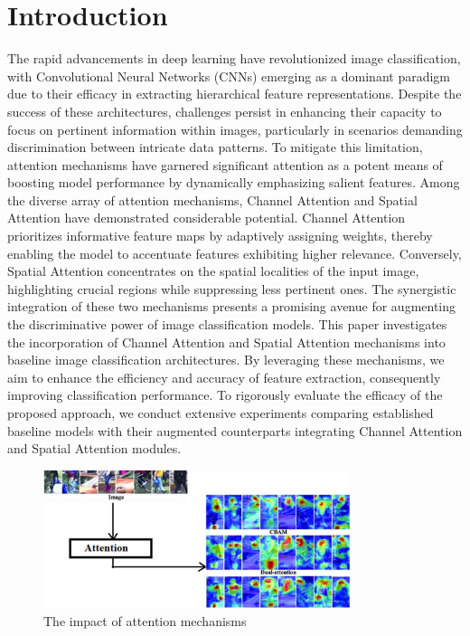 \documentclass[pdflatex,sn-mathphys-num]{sn-jnl}%
\theoremstyle{thmstyleone}%
\theoremstyle{thmstyletwo}%
\theoremstyle{thmstylethree}%
\begin{document}
\section{Introduction}\label{sec1}
The rapid advancements in deep learning have revolutionized image classification, with Convolutional Neural Networks (CNNs) emerging as a dominant paradigm due to their efficacy in extracting hierarchical feature representations. Despite the success of these architectures, challenges persist in enhancing their capacity to focus on pertinent information within images, particularly in scenarios demanding discrimination between intricate data patterns.
To mitigate this limitation, attention mechanisms have garnered significant attention as a potent means of boosting model performance by dynamically emphasizing salient features. Among the diverse array of attention mechanisms, Channel Attention and Spatial Attention have demonstrated considerable potential\cite{b1}. Channel Attention prioritizes informative feature maps by adaptively assigning weights, thereby enabling the model to accentuate features exhibiting higher relevance\cite{b4}. Conversely, Spatial Attention concentrates on the spatial localities of the input image, highlighting crucial regions while suppressing less pertinent ones\cite{b4}. The synergistic integration of these two mechanisms presents a promising avenue for augmenting the discriminative power of image classification models.
This paper investigates the incorporation of Channel Attention and Spatial Attention mechanisms into baseline image classification architectures. By leveraging these mechanisms, we aim to enhance the efficiency and accuracy of feature extraction, consequently improving classification performance. To rigorously evaluate the efficacy of the proposed approach, we conduct extensive experiments comparing established baseline models with their augmented counterparts integrating Channel Attention and Spatial Attention modules.
\begin{figure}[h]
  \centering
  \includegraphics[width=0.8\textwidth]{Figures/intro2.png}
   \caption{The impact of attention mechanisms}
  \label{fig:h1}
\end{figure}
\end{document}
